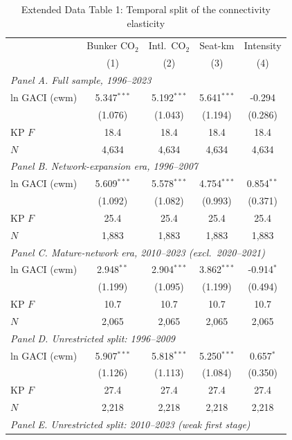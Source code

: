 \begin{table}[htbp]
\centering
\begin{threeparttable}
\caption{Extended Data Table 1: Temporal split of the connectivity elasticity}
\label{tab:temporal}
\footnotesize
\begin{tabular}{lcccc}
\toprule
 & \multicolumn{1}{c}{Bunker CO$_2$} & \multicolumn{1}{c}{Intl.\ CO$_2$} & \multicolumn{1}{c}{Seat-km} & \multicolumn{1}{c}{Intensity} \\
 & (1) & (2) & (3) & (4) \\
\midrule
\multicolumn{5}{l}{\textit{Panel A. Full sample, 1996--2023}} \\
  ln GACI (cwm) & 5.347$^{***}$ & 5.192$^{***}$ & 5.641$^{***}$ & -0.294 \\
   & (1.076) & (1.043) & (1.194) & (0.286) \\
  KP $F$ & 18.4 & 18.4 & 18.4 & 18.4 \\
  $N$ & 4,634 & 4,634 & 4,634 & 4,634 \\
\midrule
\multicolumn{5}{l}{\textit{Panel B. Network-expansion era, 1996--2007}} \\
  ln GACI (cwm) & 5.609$^{***}$ & 5.578$^{***}$ & 4.754$^{***}$ & 0.854$^{**}$ \\
   & (1.092) & (1.082) & (0.993) & (0.371) \\
  KP $F$ & 25.4 & 25.4 & 25.4 & 25.4 \\
  $N$ & 1,883 & 1,883 & 1,883 & 1,883 \\
\midrule
\multicolumn{5}{l}{\textit{Panel C. Mature-network era, 2010--2023 (excl.\ 2020--2021)}} \\
  ln GACI (cwm) & 2.948$^{**}$ & 2.904$^{***}$ & 3.862$^{***}$ & -0.914$^{*}$ \\
   & (1.199) & (1.095) & (1.199) & (0.494) \\
  KP $F$ & 10.7 & 10.7 & 10.7 & 10.7 \\
  $N$ & 2,065 & 2,065 & 2,065 & 2,065 \\
\midrule
\multicolumn{5}{l}{\textit{Panel D. Unrestricted split: 1996--2009}} \\
  ln GACI (cwm) & 5.907$^{***}$ & 5.818$^{***}$ & 5.250$^{***}$ & 0.657$^{*}$ \\
   & (1.126) & (1.113) & (1.084) & (0.350) \\
  KP $F$ & 27.4 & 27.4 & 27.4 & 27.4 \\
  $N$ & 2,218 & 2,218 & 2,218 & 2,218 \\
\midrule
\multicolumn{5}{l}{\textit{Panel E. Unrestricted split: 2010--2023 (weak first stage)}} \\

\end{tabular}
\end{threeparttable}
\end{table}
